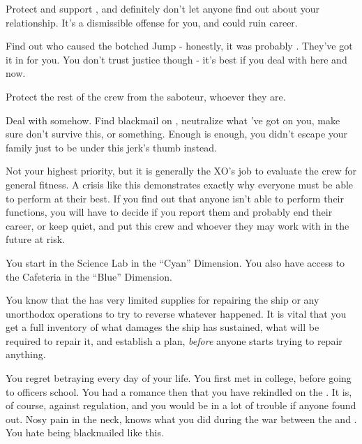 \documentclass[char]{TMFHope}
\begin{document}
\begin{itemz}[Goals]
	\item Protect and support \cSci{}, and definitely don't let anyone find out about your relationship. It's a dismissible offense for you, and could ruin \cSci{\their} career.
	\item Find out who caused the botched Jump - honestly, it was probably \cDip{}. They've got it in for you. You don't trust \pPlan{} justice though - it's best if you deal with \cDip{\them} here and now.
	\item Protect the rest of the crew from the saboteur, whoever they are.
	\item Deal with \cDip{} somehow. Find blackmail on \cDip{\them}, neutralize what \cDip{\they}'ve got on you, make sure \cDip{\they} don't survive this, or something. Enough is enough, you didn't escape your family just to be under this jerk's thumb instead.
	\item Not your highest priority, but it is generally the XO's job to evaluate the crew for general fitness. A crisis like this demonstrates exactly why everyone must be able to perform at their best. If you find out that anyone isn't able to perform their functions, you will have to decide if you report them and probably end their career, or keep quiet, and put this crew and whoever they may work with in the future at risk.
\end{itemz}

\begin{itemz}[Notes]
	\item You start in the Science Lab in the ``Cyan'' Dimension. You also have access to the Cafeteria in the ``Blue'' Dimension. 
	\item You know that the \pNew{} has very limited supplies for repairing the ship or any unorthodox operations to try to reverse whatever happened. It is vital that you get a full inventory of what damages the ship has sustained, what will be required to repair it, and establish a plan, \emph{before} anyone starts trying to repair anything.
\end{itemz}

\begin{contacts}
	\contact{\cCap{}} You regret betraying \cCap{} every day of your life.
	\contact{\cSci{}} You first met \cSci{} in college, before going to officers school. You had a romance then that you have rekindled on the \pNew{}. It is, of course, against regulation, and you would be in a lot of trouble if anyone found out.
	\contact{\cDip{}} Nosy pain in the neck, \cDip{} knows what you did during the war between the \pPlan{} and \pEdge{}. You hate being blackmailed like this.
\end{contacts}
\end{document}
